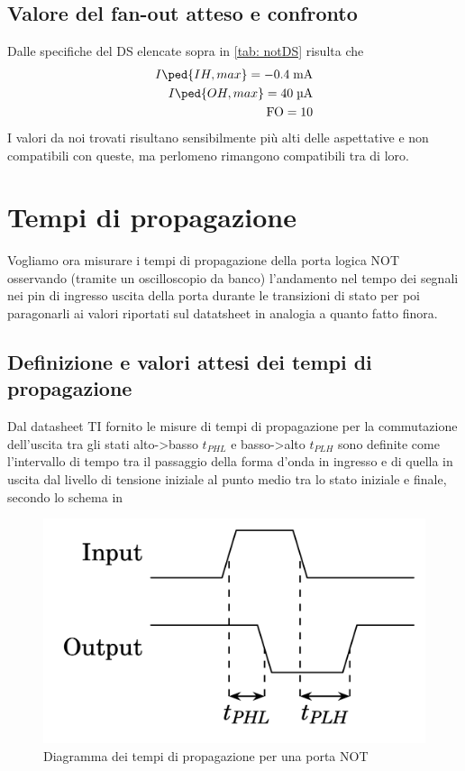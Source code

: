 \documentclass[10pt, a4paper, italian]{article}
\begin{document}
\subsection{Valore del fan-out atteso e confronto}
Dalle specifiche del DS elencate sopra in \ref{tab: notDS} risulta che
\begin{align*}
    I\ped{IH, max}= -0.4 \; \si{m\A} \\
    I\ped{OH, max}= 40 \; \si{\micro\A} \\
    \text{FO} = 10
\end{align*}
I valori da noi trovati risultano sensibilmente più alti delle aspettative
e non compatibili con queste, ma perlomeno rimangono compatibili tra di loro.

\section{Tempi di propagazione}
Vogliamo ora misurare i tempi di propagazione della porta logica NOT
osservando (tramite un oscilloscopio da banco) l'andamento nel tempo dei
segnali nei pin di ingresso uscita della porta durante le transizioni di stato
per poi paragonarli ai valori riportati sul datatsheet in analogia a quanto
fatto finora.

\subsection{Definizione e valori attesi dei tempi di propagazione}
Dal datasheet TI fornito le misure di tempi di propagazione per la commutazione
dell'uscita tra gli stati alto->basso $t_{PHL}$ e basso->alto $t_{PLH}$ sono
definite come l'intervallo di tempo tra il passaggio della forma d'onda in
ingresso e di quella in uscita dal livello di tensione iniziale al punto
medio tra lo stato iniziale e finale, secondo lo schema in 

\begin{figure}[htbp]
\centering
	\includegraphics[scale=0.4]{notdelay}
	\caption{Diagramma dei tempi di propagazione per una porta NOT}
\end{figure}
\end{document}
